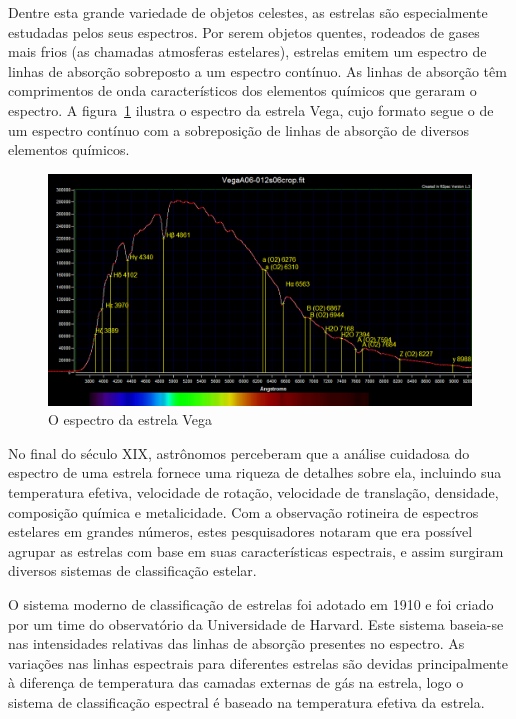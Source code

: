 Dentre esta grande variedade de objetos celestes, as estrelas são especialmente estudadas pelos seus espectros. Por serem objetos quentes, rodeados de gases mais frios (as chamadas atmosferas estelares), estrelas emitem um espectro de linhas de absorção sobreposto a um espectro contínuo. As linhas de absorção têm comprimentos de onda característicos dos elementos químicos que geraram o espectro. A figura~\ref{fig:vega-spectrum} ilustra o espectro da estrela Vega, cujo formato segue o de um espectro contínuo com a sobreposição de linhas de absorção de diversos elementos químicos.

\begin{figure}[htb]
\centering
\includegraphics[width=12cm]{figuras/vega_spectrum.jpg}
\caption{O espectro da estrela Vega\citep{vega-spectrum}}
\label{fig:vega-spectrum}
\end{figure}

No final do século XIX, astrônomos perceberam que a análise cuidadosa do espectro de uma estrela fornece uma riqueza de detalhes sobre ela, incluindo sua temperatura efetiva, velocidade de rotação, velocidade de translação, densidade, composição química e metalicidade. Com a observação rotineira de espectros estelares em grandes números, estes pesquisadores notaram que era possível agrupar as estrelas com base em suas características espectrais, e assim surgiram diversos sistemas de classificação estelar. 

O sistema moderno de classificação de estrelas foi adotado em 1910 e foi criado por um time do observatório da Universidade de Harvard. Este sistema baseia-se nas intensidades relativas das linhas de absorção presentes no espectro. As variações nas linhas espectrais para diferentes estrelas são devidas principalmente à diferença de temperatura das camadas externas de gás na estrela, logo o sistema de classificação espectral é baseado na temperatura efetiva da estrela. 

